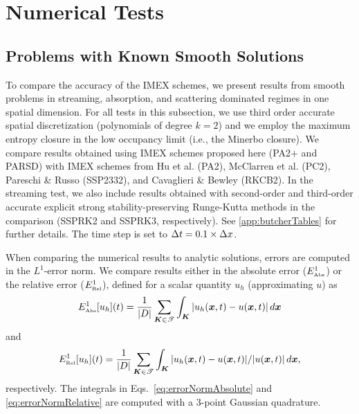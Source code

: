 \section{Numerical Tests}
\label{sec:numerical}

\subsection{Problems with Known Smooth Solutions}
\label{sec:smoothProblems}

To compare the accuracy of the IMEX schemes, we present results from smooth problems in streaming, absorption, and scattering dominated regimes in one spatial dimension.  
For all tests in this subsection, we use third order accurate spatial discretization (polynomials of degree $k=2$) and we employ the maximum entropy closure in the low occupancy limit (i.e., the Minerbo closure).  
We compare results obtained using IMEX schemes proposed here (PA2+ and PARSD) with IMEX schemes from Hu et al. \cite{hu_etal_2018} (PA2), McClarren et al. \cite{mcclarren_etal_2008} (PC2), Pareschi \& Russo \cite{pareschiRusso_2005} (SSP2332), and Cavaglieri \& Bewley \cite{cavaglieriBewley2015} (RKCB2).  
In the streaming test, we also include results obtained with second-order and third-order accurate explicit strong stability-preserving Runge-Kutta methods \cite{gottlieb_etal_2001} in the comparison (SSPRK2 and SSPRK3, respectively).  
See \ref{app:butcherTables} for further details.  
The time step is set to $\Delta t=0.1\times\Delta x$.  

When comparing the numerical results to analytic solutions, errors are computed in the $L^{1}$-error norm.  
We compare results either in the absolute error ($E_{\mbox{\tiny Abs}}^{1}$) or the relative error ($E_{\mbox{\tiny Rel}}^{1}$), defined for a scalar quantity $u_{h}$ (approximating $u$) as
\begin{equation}
  E_{\mbox{\tiny Abs}}^{1}[u_{h}](t)
  =\frac{1}{|D|}\sum_{\boldsymbol{K}\in\mathscr{T}}\int_{\boldsymbol{K}}|u_{h}(\boldsymbol{x},t)-u(\boldsymbol{x},t)|\,d\boldsymbol{x}
  \label{eq:errorNormAbsolute}
\end{equation}
and
\begin{equation}
  E_{\mbox{\tiny Rel}}^{1}[u_{h}](t)
  =\frac{1}{|D|}\sum_{\boldsymbol{K}\in\mathscr{T}}\int_{\boldsymbol{K}}|u_{h}(\boldsymbol{x},t)-u(\boldsymbol{x},t)|/|u(\boldsymbol{x},t)|\,d\boldsymbol{x},
  \label{eq:errorNormRelative}
\end{equation}
respectively.  
The integrals in Eqs.~\eqref{eq:errorNormAbsolute} and \eqref{eq:errorNormRelative} are computed with a $3$-point Gaussian quadrature.  

